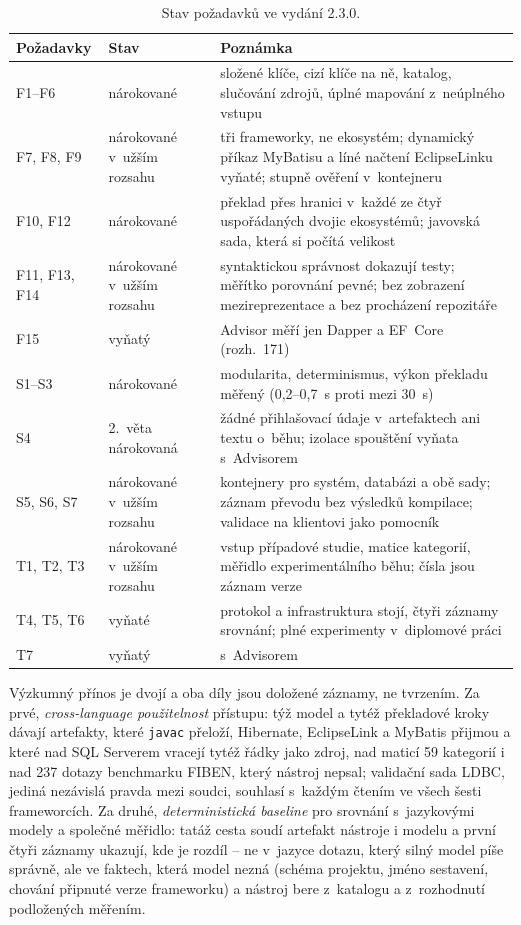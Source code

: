 \documentclass{article}
\begin{document}
\begin{table}[ht]
\centering\small
\begin{tabularx}{\textwidth}{L{2.4cm} L{3.2cm} Y}
\toprule
\textbf{Požadavky} & \textbf{Stav} & \textbf{Poznámka} \\
\midrule
F1--F6 & nárokované & složené klíče, cizí klíče na ně, katalog, slučování zdrojů, úplné mapování z~neúplného vstupu \\
F7, F8, F9 & nárokované v~užším rozsahu & tři frameworky, ne ekosystém; dynamický příkaz MyBatisu a líné načtení EclipseLinku vyňaté; stupně ověření v~kontejneru \\
F10, F12 & nárokované & překlad přes hranici v~každé ze čtyř uspořádaných dvojic ekosystémů; javovská sada, která si počítá velikost \\
F11, F13, F14 & nárokované v~užším rozsahu & syntaktickou správnost dokazují testy; měřítko porovnání pevné; bez zobrazení mezireprezentace a bez procházení repozitáře \\
F15 & vyňatý & Advisor měří jen Dapper a EF~Core (rozh.~171) \\
S1--S3 & nárokované & modularita, determinismus, výkon překladu měřený (0,2--0,7~s proti mezi 30~s) \\
S4 & 2.~věta nárokovaná & žádné přihlašovací údaje v~artefaktech ani textu o~běhu; izolace spouštění vyňata s~Advisorem \\
S5, S6, S7 & nárokované v~užším rozsahu & kontejnery pro systém, databázi a obě sady; záznam převodu bez výsledků kompilace; validace na klientovi jako pomocník \\
T1, T2, T3 & nárokované v~užším rozsahu & vstup případové studie, matice kategorií, měřidlo experimentálního běhu; čísla jsou záznam verze \\
T4, T5, T6 & vyňaté & protokol a infrastruktura stojí, čtyři záznamy srovnání; plné experimenty v~diplomové práci \\
T7 & vyňatý & s~Advisorem \\
\bottomrule
\end{tabularx}
\caption{Stav požadavků ve vydání 2.3.0.}
\label{tab:pozadavky}
\end{table}

Výzkumný přínos je dvojí a oba díly jsou doložené záznamy, ne tvrzením. Za prvé, \emph{cross-language použitelnost} přístupu: týž model a tytéž překladové kroky dávají artefakty, které \texttt{javac} přeloží, Hibernate, EclipseLink a MyBatis přijmou a které nad SQL Serverem vracejí tytéž řádky jako zdroj, nad maticí 59 kategorií i nad 237 dotazy benchmarku FIBEN, který nástroj nepsal; validační sada LDBC, jediná nezávislá pravda mezi soudci, souhlasí s~každým čtením ve všech šesti frameworcích. Za druhé, \emph{deterministická baseline} pro srovnání s~jazykovými modely a společné měřidlo: tatáž cesta soudí artefakt nástroje i modelu a první čtyři záznamy ukazují, kde je rozdíl -- ne v~jazyce dotazu, který silný model píše správně, ale ve faktech, která model nezná (schéma projektu, jméno sestavení, chování připnuté verze frameworku) a nástroj bere z~katalogu a z~rozhodnutí podložených měřením.
\end{document}
